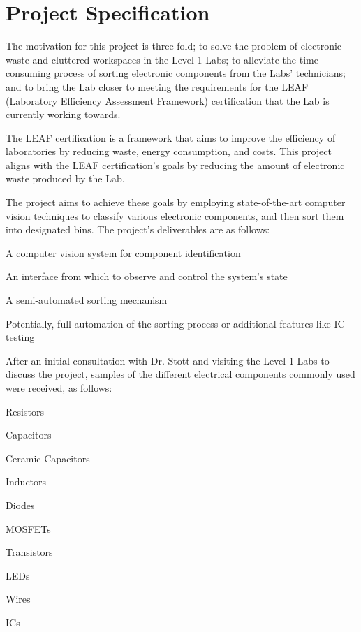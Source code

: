 \section{Project Specification}
\label{sec:project-specification}
The motivation for this project is three-fold; to solve the problem of electronic waste and cluttered workspaces in the Level 1 Labs;
to alleviate the time-consuming process of sorting electronic components from the Labs' technicians; and 
to bring the Lab closer to meeting the requirements for the LEAF (Laboratory Efficiency Assessment Framework) certification\cite{leaf} that
the Lab is currently working towards.

The LEAF certification is a framework that aims to improve the efficiency of laboratories by reducing waste, energy consumption, and costs.
This project aligns with the LEAF certification's goals by reducing the amount of electronic waste produced by the Lab.

The project aims to achieve these goals by employing state-of-the-art computer vision techniques to classify various electronic components,
and then sort them into designated bins. The project's deliverables are as follows:
\begin{mylist}
  \item A computer vision system for component identification
  \item An interface from which to observe and control the system's state
  \item A semi-automated sorting mechanism
  \item Potentially, full automation of the sorting process or additional features like IC testing
\end{mylist}
\noindent
After an initial consultation with Dr. Stott and visiting the Level 1 Labs to discuss the project,
samples of the different electrical components commonly used were received, as follows:
\begin{multicols}{2}
  \begin{mylist}
    \item Resistors
    \item Capacitors
    \item Ceramic Capacitors
    \item Inductors
    \item Diodes
    \item MOSFETs
    \item Transistors
    \item LEDs
    \item Wires
    \item ICs
  \end{mylist}
\end{multicols}

